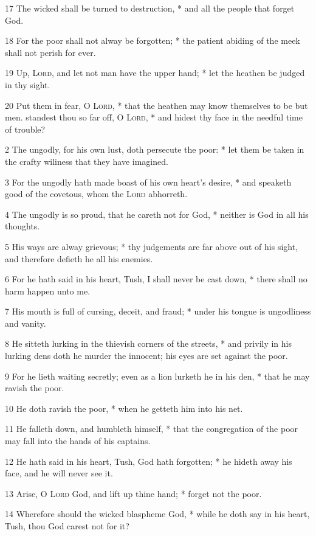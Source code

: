 17 The wicked shall be turned to destruction, * and all the people that forget God.\par
18 For the poor shall not alway be forgotten; * the patient abiding of the meek shall not perish for ever.\par
19 Up, {\textsc{Lord}}, and let not man have the upper hand; * let the heathen be judged in thy sight.\par
20 Put them in fear, O {\textsc{Lord}}, * that the heathen may know themselves to be but men.
 standest thou so far off, O {\textsc{Lord}}, * and hidest thy face in the needful time of trouble?\par
2 The ungodly, for his own lust, doth persecute the poor: * let them be taken in the crafty wiliness that they have imagined.\par
3 For the ungodly hath made boast of his own heart's desire, * and speaketh good of the covetous, whom the {\textsc{Lord}} abhorreth.\par
4 The ungodly is so proud, that he careth not for God, * neither is God in all his thoughts.\par
5 His ways are alway grievous; * thy judgements are far above out of his sight, and therefore defieth he all his enemies.\par
6 For he hath said in his heart, Tush, I shall never be cast down, * there shall no harm happen unto me.\par
7 His mouth is full of cursing, deceit, and fraud; * under his tongue is ungodliness and vanity.\par
8 He sitteth lurking in the thievish corners of the streets, * and privily in his lurking dens doth he murder the innocent; his eyes are set against the poor.\par
9 For he lieth waiting secretly; even as a lion lurketh he in his den, * that he may ravish the poor.\par
10 He doth ravish the poor, * when he getteth him into his net.\par
11 He falleth down, and humbleth himself, * that the congregation of the poor may fall into the hands of his captains.\par
12 He hath said in his heart, Tush, God hath forgotten; * he hideth away his face, and he will never see it.\par
13 Arise, O {\textsc{Lord}} God, and lift up thine hand; * forget not the poor.\par
14 Wherefore should the wicked blaspheme God, * while he doth say in his heart, Tush, thou God carest not for it?\par
